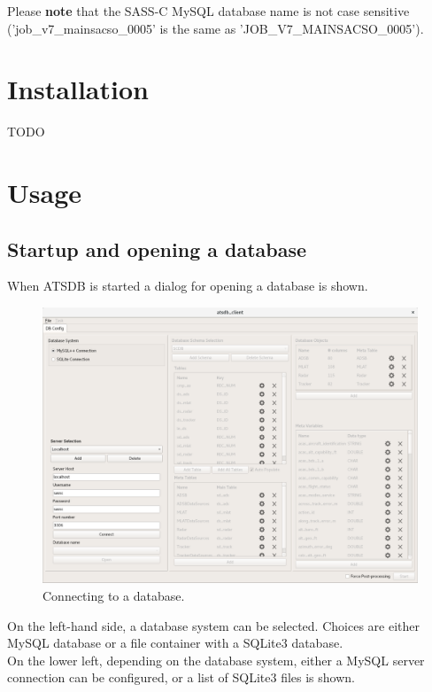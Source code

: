 \documentclass[10pt,letterpaper,extrafontsizes]{memoir}
\begin{document}
Please \textbf{note} that the SASS-C MySQL database name is not case sensitive ('job\_v7\_mainsacso\_0005' is the same as 'JOB\_V7\_MAINSACSO\_0005').

\chapter{Installation}
\label{sec:installation}

TODO

\chapter{Usage}
\label{sec:usage}

\section{Startup and opening a database}
\label{sec:startup}

When  ATSDB  is  started  a  dialog  for  opening  a  database  is  shown. 

\begin{figure}[H]
  \hspace*{-3cm}
    \includegraphics[width=18cm]{../screenshots/db_config_connect.png}
  \caption{Connecting to a database.}
  \label{fig:db_open}
\end{figure}

On the left-hand side, a database system can be selected.  Choices are either MySQL database or a file container with a SQLite3 database. \\
On the lower left, depending on the database system, either a MySQL server connection can be configured, or a list of SQLite3 files is shown.\\
\end{document}

